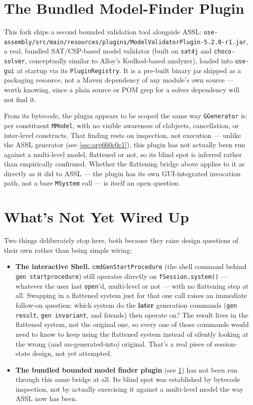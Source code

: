 \documentclass[11pt,twoside,a4paper]{book}
\begin{document}
\section{The Bundled Model-Finder Plugin}
\label{sec:org668373d}

This fork ships a second bounded validation tool alongside ASSL:
\texttt{use-assembly/src/main/resources/plugins/ModelValidatorPlugin-5.2.0-r1.jar},
a real, bundled SAT/CSP-based model validator (built on \texttt{sat4j} and
\texttt{choco-solver}, conceptually similar to Alloy's Kodkod-based analyzer),
loaded into \texttt{use-gui} at startup via its \texttt{PluginRegistry}. It is a
pre-built binary jar shipped as a packaging resource, not a Maven
dependency of any module's own source --- worth knowing, since a plain
source or POM grep for a solver dependency will not find it.

From its bytecode, the plugin appears to be scoped the same way
\texttt{GGenerator} is: per constituent \texttt{MModel}, with no visible awareness of
clabjects, cancellation, or inter-level constructs. That finding rests
on inspection, not execution --- unlike the ASSL generator (see
\ref{sec:org660c0c1}), this plugin has not actually been run
against a multi-level model, flattened or not, so its blind spot is
inferred rather than empirically confirmed. Whether the flattening
bridge above applies to it as directly as it did to ASSL --- the
plugin has its own GUI-integrated invocation path, not a bare
\texttt{MSystem} call --- is itself an open question.

\section{What's Not Yet Wired Up}
\label{sec:orge7bf090}
\begin{manualwarning}
Two things deliberately stop here, both because they raise design
questions of their own rather than being simple wiring:

\begin{itemize}
\item \textbf{The interactive Shell.} \texttt{cmdGenStartProcedure} (the shell command
behind \texttt{gen startprocedure}) still operates directly on
\texttt{fSession.system()} --- whatever the user last \texttt{open}'d, multi-level
or not --- with no flattening step at all. Swapping in a flattened
system just for that one call raises an immediate follow-on question:
which system do the \textbf{later} generation commands (\texttt{gen result},
\texttt{gen invariant}, and friends) then operate on? The result lives in
the flattened system, not the original one, so every one of those
commands would need to know to keep using the flattened system
instead of silently looking at the wrong (and un-generated-into)
original. That's a real piece of session-state design, not yet
attempted.
\item \textbf{The bundled bounded model finder plugin} (see
\ref{sec:org668373d}) has not been run through this same bridge at
all. Its blind spot was established by bytecode inspection, not by
actually exercising it against a multi-level model the way ASSL now
has been.
\end{itemize}
\end{manualwarning}
\end{document}
